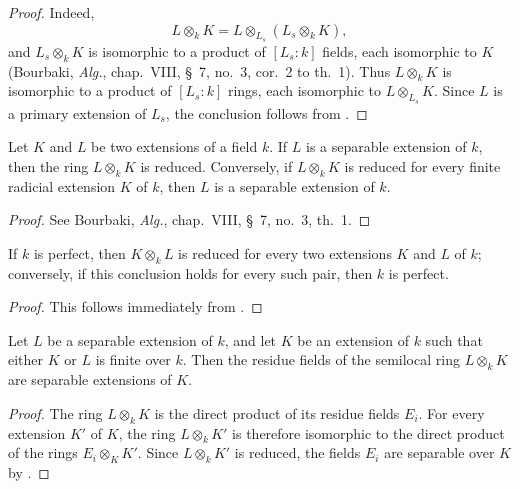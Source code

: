\begin{proof}
Indeed,
\[
L\otimes_k K
=L\otimes_{L_s}(L_s\otimes_k K),
\]
and $L_s\otimes_k K$ is isomorphic to a product of $[L_s:k]$ fields,
each isomorphic to $K$
(Bourbaki, \emph{Alg.}, chap.~VIII, \S~7, no.~3,
cor.~2 to th.~1).
Thus $L\otimes_k K$ is isomorphic to a product of $[L_s:k]$ rings,
each isomorphic to $L\otimes_{L_s}K$.
Since $L$ is a primary extension of $L_s$, the conclusion follows from
.
\end{proof}

\begin{proposition}[4.3.5]
\label{IV.4.3.5}
Let $K$ and $L$ be two extensions of a field $k$.
If $L$ is a separable extension of $k$, then the ring
$L\otimes_k K$ is reduced.
Conversely, if $L\otimes_k K$ is reduced for every finite radicial
extension $K$ of $k$, then $L$ is a separable extension of $k$.
\end{proposition}

\begin{proof}
See Bourbaki, \emph{Alg.}, chap.~VIII, \S~7, no.~3, th.~1.
\end{proof}

\begin{corollary}[4.3.6]
\label{IV.4.3.6}
If $k$ is perfect, then $K\otimes_k L$ is reduced for every two
extensions $K$ and $L$ of $k$; conversely, if this conclusion holds for
every such pair, then $k$ is perfect.
\end{corollary}

\begin{proof}
This follows immediately from .
\end{proof}

\begin{corollary}[4.3.7]
\label{IV.4.3.7}
Let $L$ be a separable extension of $k$, and let $K$ be an extension of
$k$ such that either $K$ or $L$ is finite over $k$.
Then the residue fields of the semilocal ring $L\otimes_k K$ are
separable extensions of $K$.
\end{corollary}

\begin{proof}
The ring $L\otimes_k K$ is the direct product of its residue fields
$E_i$.
For every extension $K'$ of $K$, the ring $L\otimes_k K'$ is therefore
isomorphic to the direct product of the rings $E_i\otimes_K K'$.
Since $L\otimes_k K'$ is reduced, the fields $E_i$ are separable over
$K$ by .
\end{proof}

